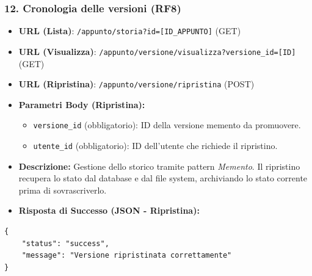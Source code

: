 \subsubsection{12. Cronologia delle versioni (RF8)}
\begin{itemize}
    \item \textbf{URL (Lista)}: \texttt{/appunto/storia?id=[ID\_APPUNTO]} (GET)
    \item \textbf{URL (Visualizza)}: \texttt{/appunto/versione/visualizza?versione\_id=[ID]} (GET)
    \item \textbf{URL (Ripristina)}: \texttt{/appunto/versione/ripristina} (POST)
    \item \textbf{Parametri Body (Ripristina):}
        \begin{itemize}
            \item \texttt{versione\_id} (obbligatorio): ID della versione memento da promuovere.
            \item \texttt{utente\_id} (obbligatorio): ID dell'utente che richiede il ripristino.
        \end{itemize}
    \item \textbf{Descrizione:} Gestione dello storico tramite pattern \textit{Memento}. Il ripristino recupera lo stato dal database e dal file system, archiviando lo stato corrente prima di sovrascriverlo.
    \item \textbf{Risposta di Successo (JSON - Ripristina):}
\end{itemize}
\begin{verbatim}
{ 
    "status": "success", 
    "message": "Versione ripristinata correttamente"
}
\end{verbatim}